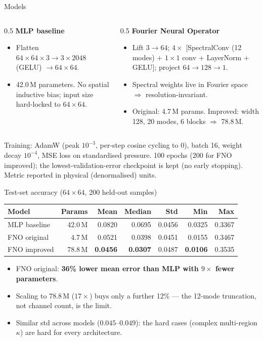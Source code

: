 \documentclass[aspectratio=169,11pt]{beamer}
\begin{document}
\begin{frame}{Models}
\begin{columns}
\begin{column}{0.5\textwidth}
\textbf{MLP baseline}
\begin{itemize}\footnotesize
  \item Flatten $64{\times}64{\times}3 \to 3{\times}2048$ (GELU) $\to 64{\times}64$.
  \item 42.0\,M parameters. No spatial inductive bias; input size hard-locked to $64\times64$.
\end{itemize}
\end{column}
\begin{column}{0.5\textwidth}
\textbf{Fourier Neural Operator}
\begin{itemize}\footnotesize
  \item Lift $3\to64$; $4\times$ [SpectralConv (12 modes) $+$ $1\times1$ conv $+$ LayerNorm $+$ GELU]; project $64\to128\to1$.
  \item Spectral weights live in Fourier space $\Rightarrow$ resolution-invariant.
  \item Original: 4.7\,M params. Improved: width 128, 20 modes, 6 blocks $\Rightarrow$ 78.8\,M.
\end{itemize}
\end{column}
\end{columns}
\vfill
\footnotesize Training: AdamW (peak $10^{-3}$, per-step cosine cycling to 0), batch 16, weight decay $10^{-4}$, MSE loss on standardised pressure. 100 epochs (200 for FNO improved); the lowest-validation-error checkpoint is kept (no early stopping). Metric reported in physical (denormalised) units.
\end{frame}

\begin{frame}{Test-set accuracy ($64\times64$, 200 held-out samples)}
\centering
\begin{table}
\begin{tabular}{lrrrrrr}
\toprule
Model & Params & Mean & Median & Std & Min & Max \\
\midrule
MLP baseline & 42.0\,M & 0.0820 & 0.0695 & 0.0456 & 0.0325 & 0.3367 \\
FNO original &  4.7\,M & 0.0521 & 0.0398 & 0.0451 & 0.0155 & 0.3467 \\
FNO improved & 78.8\,M & \textbf{0.0456} & \textbf{0.0307} & 0.0487 & \textbf{0.0106} & 0.3535 \\
\bottomrule
\end{tabular}
\end{table}
\vfill
\begin{itemize}\footnotesize
  \item FNO original: \textbf{36\% lower mean error than MLP with $9\times$ fewer parameters}.
  \item Scaling to 78.8\,M ($17\times$) buys only a further 12\% --- the 12-mode truncation, not channel count, is the limit.
  \item Similar std across models ($0.045$--$0.049$): the hard cases (complex multi-region $\kappa$) are hard for every architecture.
\end{itemize}
\end{frame}
\end{document}

